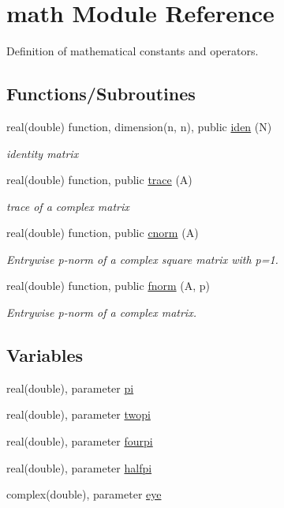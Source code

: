 \hypertarget{namespacemath}{}\section{math Module Reference}
\label{namespacemath}


Definition of mathematical constants and operators.  


\subsection*{Functions/\+Subroutines}
\begin{DoxyCompactItemize}
\item 
real(double) function, dimension(n, n), public \hyperlink{namespacemath_a43efec08acf55747fa1e14085858aade}{iden} (N)
\begin{DoxyCompactList}\small\item\em identity matrix \end{DoxyCompactList}\item 
real(double) function, public \hyperlink{namespacemath_a9f8f22c01066f03fe5900edb63b56c89}{trace} (A)
\begin{DoxyCompactList}\small\item\em trace of a complex matrix \end{DoxyCompactList}\item 
real(double) function, public \hyperlink{namespacemath_a864984937cf0f3b7bdbc9b652b84445d}{cnorm} (A)
\begin{DoxyCompactList}\small\item\em Entrywise p-\/norm of a complex square matrix with p=1. \end{DoxyCompactList}\item 
real(double) function, public \hyperlink{namespacemath_a2830cb5393b6e6a8baa8d072c73ce8a9}{fnorm} (A, p)
\begin{DoxyCompactList}\small\item\em Entrywise p-\/norm of a complex matrix. \end{DoxyCompactList}\end{DoxyCompactItemize}
\subsection*{Variables}
\begin{DoxyCompactItemize}
\item 
real(double), parameter \hyperlink{namespacemath_aa2f838077707f6cdb0c8a0ec69719690}{pi}
\item 
real(double), parameter \hyperlink{namespacemath_aeb6d7ed6a20444e26f024b34eaa4c4f7}{twopi}
\item 
real(double), parameter \hyperlink{namespacemath_a83cddb754967ada1a15217d10ed9c24b}{fourpi}
\item 
real(double), parameter \hyperlink{namespacemath_a99d72d3bce2cadc8630d10ee09aaa3ea}{halfpi}
\item 
complex(double), parameter \hyperlink{namespacemath_ae0354610846d49064ea0336f19d5bf3f}{eye}
\end{DoxyCompactItemize}


